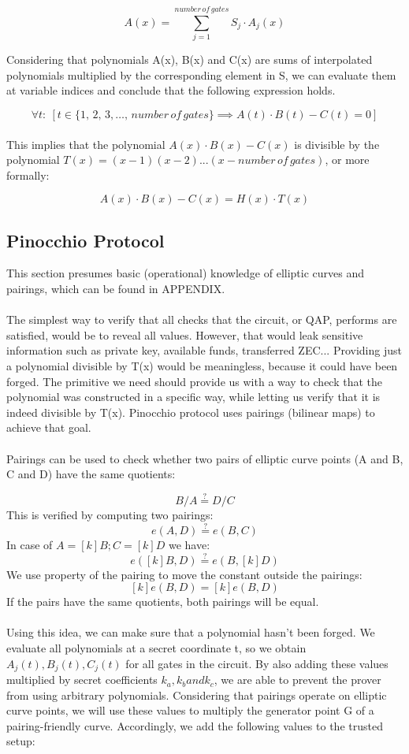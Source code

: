$$ A(x) = \sum_{j = 1}^{number\,of\,gates} S_j \cdot A_j(x) $$

Considering that polynomials A(x), B(x) and C(x) are sums of interpolated polynomials multiplied by the corresponding element in S, we can evaluate them at variable indices and conclude that the following expression holds.

$$\forall t:\: [t \in \{1,\,2,\,3, \dots ,\,number\,of\,gates\} \implies A(t) \cdot B(t) - C(t) = 0]$$
\\
This implies that the polynomial $A(x) \cdot B(x) - C(x)$ is divisible by the polynomial $T(x) = (x-1)(x-2)...(x-number\,of\,gates)$, or more formally:

$$ A(x) \cdot B(x) - C(x) = H(x) \cdot T(x) $$

\subsection{Pinocchio Protocol}

This section presumes basic (operational) knowledge of elliptic curves and pairings, which can be found in APPENDIX.\\
\\
The simplest way to verify that all checks that the circuit, or QAP, performs are satisfied, would be to reveal all values. However, that would leak sensitive information such as private key, available funds, transferred ZEC... Providing just a polynomial divisible by T(x) would be meaningless, because it could have been forged. The primitive we need should provide us with a way to check that the polynomial was constructed in a specific way, while letting us verify that it is indeed divisible by T(x). Pinocchio protocol uses  pairings (bilinear maps) to achieve that goal.\\
\\
Pairings can be used to check whether two pairs of elliptic curve points (A and B, C and D) have the same quotients:

$$ B / A \stackrel{?}{=} D / C $$
This is verified by computing two pairings:
$$ e(A, D) \stackrel{?}{=} e(B, C) $$
In case of $A = [k]B; C = [k]D$ we have:
$$ e([k]B, D) \stackrel{?}{=} e(B, [k]D)$$
We use property of the pairing to move the constant outside the pairings:
$$ [k]e(B, D) = [k]e(B, D) $$
If the pairs have the same quotients, both pairings will be equal.\\
\\
Using this idea, we can make sure that a polynomial hasn't been forged. We evaluate all polynomials at a secret coordinate t, so we obtain $A_j(t), B_j(t), C_j(t)$ for all gates in the circuit. By also adding these values multiplied by secret coefficients $k_a, k_b and k_c$, we are able to prevent the prover from using arbitrary polynomials. Considering that pairings operate on elliptic curve points, we will use these values to multiply the generator point G of a pairing-friendly curve. Accordingly, we add the following values to the trusted setup:

